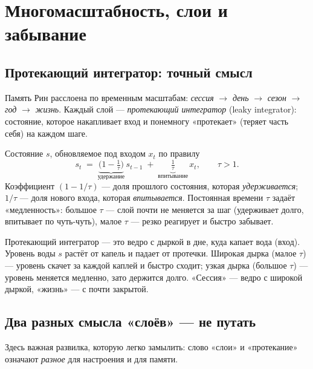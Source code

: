 \chapter{Многомасштабность, слои и забывание}
\label{ch:timescales}

\section{Протекающий интегратор: точный смысл}

Память Рин расслоена по временным масштабам: \emph{сессия} $\to$ \emph{день} $\to$
\emph{сезон} $\to$ \emph{год} $\to$ \emph{жизнь}. Каждый слой — \emph{протекающий
интегратор} (leaky integrator): состояние, которое накапливает вход и понемногу
«протекает» (теряет часть себя) на каждом шаге.

\begin{definition}
Состояние $s$, обновляемое под входом $x_t$ по правилу
\begin{equation}
s_t \;=\; \underbrace{\Big(1-\tfrac{1}{\tau}\Big)}_{\text{удержание}}\,s_{t-1}
\;+\; \underbrace{\tfrac{1}{\tau}}_{\text{впитывание}}\,x_t,
\qquad \tau>1.
\label{eq:leaky}
\end{equation}
Коэффициент $(1-1/\tau)$ — доля прошлого состояния, которая \emph{удерживается};
$1/\tau$ — доля нового входа, которая \emph{впитывается}. Постоянная времени $\tau$
задаёт «медленность»: большое $\tau$ — слой почти не меняется за шаг (удерживает
долго, впитывает по чуть-чуть), малое $\tau$ — резко реагирует и быстро забывает.
\end{definition}

\begin{intuition}
Протекающий интегратор — это ведро с дыркой в дне, куда капает вода (вход). Уровень
воды $s$ растёт от капель и падает от протечки. Широкая дырка (малое $\tau$) —
уровень скачет за каждой каплей и быстро сходит; узкая дырка (большое $\tau$) —
уровень меняется медленно, зато держится долго. «Сессия» — ведро с широкой дыркой,
«жизнь» — с почти закрытой.
\end{intuition}

\section{Два разных смысла «слоёв» — не путать}
\label{sec:twolayers}

Здесь важная развилка, которую легко замылить: слово «слои» и «протекание» означают
\emph{разное} для настроения и для памяти.

